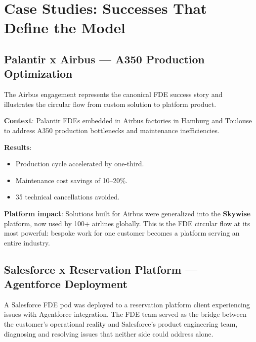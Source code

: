 \section{Case Studies: Successes That Define the Model}

\subsection{Palantir x Airbus --- A350 Production Optimization}

The Airbus engagement represents the canonical FDE success story and
illustrates the circular flow from custom solution to platform product.

\begin{tcolorbox}[
    colback=mslightgray, colframe=msblue,
    boxrule=0.5pt, arc=3pt,
    left=8pt, right=8pt, top=6pt, bottom=6pt
]
\textbf{Context}: Palantir FDEs embedded in Airbus factories in Hamburg
and Toulouse to address A350 production bottlenecks and maintenance
inefficiencies.

\vspace{4pt}
\textbf{Results}:
\begin{itemize}[topsep=2pt]
    \item Production cycle accelerated by one-third.
    \item Maintenance cost savings of 10--20\%.
    \item 35 technical cancellations avoided.
\end{itemize}

\vspace{4pt}
\textbf{Platform impact}: Solutions built for Airbus were generalized
into the \textbf{Skywise} platform, now used by 100+ airlines globally.
This is the FDE circular flow at its most powerful: bespoke work for one
customer becomes a platform serving an entire industry.
\end{tcolorbox}

\subsection{Salesforce x Reservation Platform --- Agentforce Deployment}

A Salesforce FDE pod was deployed to a reservation platform client
experiencing issues with Agentforce integration. The FDE team served as
the bridge between the customer's operational reality and Salesforce's
product engineering team, diagnosing and resolving issues that neither
side could address alone.

